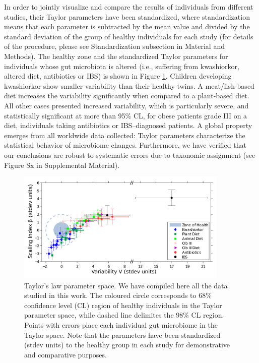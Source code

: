 In order to jointly visualize and compare the results of individuals from different studies, their Taylor parameters have been standardized, where standardization means that each parameter is subtracted by the mean value and divided by the standard deviation of the group of healthy individuals for each study (for details of the procedure, please see Standardization subsection in Material and Methods). The healthy zone and the standardized Taylor parameters for individuals whose gut microbiota is altered (i.e., suffering from kwashiorkor, altered diet, antibiotics or IBS) is shown in Figure \ref{fig:main2}. Children developing kwashiorkor show smaller variability than their healthy twins. A meat/fish-based diet increases the variability significantly when compared to a plant-based diet. All other cases presented increased variability, which is particularly severe, and statistically significant at more than 95\% CL, for obese patients grade III on a diet, individuals taking antibiotics or IBS--diagnosed patients. A global property emerges from all worldwide data collected: Taylor parameters characterize the statistical behavior of microbiome changes. Furthermore, we have verified that our conclusions are robust to systematic errors due to taxonomic assignment (see Figure Sx in Supplemental Material).

\begin{figure}
	\centering
	\includegraphics[width=0.9\textwidth]{results/finalplot11.pdf}
	\caption{Taylor's law parameter space. We have compiled here all the data studied in this work. The coloured circle corresponds to 68\% confidence level (CL) region of healthy individuals in the Taylor parameter space, while dashed line delimites the 98\% CL region. Points with errors place each individual gut microbiome in the Taylor space. Note that the parameters have been standardized (stdev units) to the healthy group in each study for demonstrative and comparative purposes.}
	\label{fig:main2}
\end{figure}

